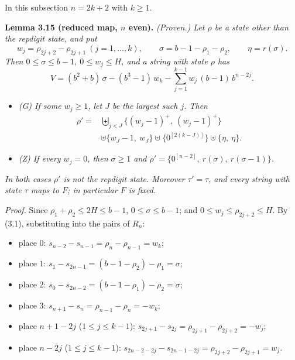 \documentclass[11pt,letterpaper]{article}
\providecommand{\tightlist}{%
  \setlength{\itemsep}{0pt}\setlength{\parskip}{0pt}}
\theoremstyle{paperstyle}
\theoremstyle{paperstyledef}
\theoremstyle{paperstylerem}
\begin{document}
In this subsection \(n = 2k + 2\) with \(k \geq 1\).

\textbf{Lemma 3.15 (reduced map, \(n\) even).} \emph{(Proven.) Let \(\rho\) be a state other than the repdigit state, and put} \[w_j = \rho_{2j+2} - \rho_{2j+1} \ (j = 1, \dots, k), \qquad \sigma = b - 1 - \rho_1 - \rho_2, \qquad \eta = r(\sigma).\] \emph{Then \(0 \leq \sigma \leq b - 1\), \(0 \leq w_j \leq H\), and a string with state \(\rho\) has} \[V = (b^2 + b)\,\sigma - (b^3 - 1)\, w_k - \sum_{j=1}^{k-1} w_j\, (b-1)\, b^{n-2j}.\]

\begin{itemize}
\tightlist
\item
  \emph{(G) If some \(w_j \geq 1\), let \(J\) be the largest such \(j\). Then} \[\begin{aligned} \rho' = {} & \biguplus_{j<J} \{(w_j - 1)^+,\ (w_j - 1)^+\} \\ & \uplus \{w_J - 1,\ w_J\} \uplus \{0^{[2(k-J)]}\} \uplus \{\eta,\ \eta\}. \end{aligned}\]
\item
  \emph{(Z) If every \(w_j = 0\), then \(\sigma \geq 1\) and \(\rho' = \{0^{[n-2]},\ r(\sigma),\ r(\sigma - 1)\}\).}
\end{itemize}

\emph{In both cases \(\rho'\) is not the repdigit state. Moreover \(\tau' = \tau\), and every string with state \(\tau\) maps to \(F\); in particular \(F\) is fixed.}

\emph{Proof.} Since \(\rho_1 + \rho_2 \leq 2H \leq b - 1\), \(0 \leq \sigma \leq b-1\); and \(0 \leq w_j \leq \rho_{2j+2} \leq H\). By (3.1), substituting into the pairs of \(R_n\):

\begin{itemize}
\tightlist
\item
  place \(0\): \(s_{n-2} - s_{n-1} = \rho_n - \rho_{n-1} = w_k\);
\item
  place \(1\): \(s_1 - s_{2n-1} = (b-1-\rho_2) - \rho_1 = \sigma\);
\item
  place \(2\): \(s_0 - s_{2n-2} = (b-1-\rho_1) - \rho_2 = \sigma\);
\item
  place \(3\): \(s_{n+1} - s_n = \rho_{n-1} - \rho_n = -w_k\);
\item
  place \(n+1-2j\) (\(1 \leq j \leq k-1\)): \(s_{2j+1} - s_{2j} = \rho_{2j+1} - \rho_{2j+2} = -w_j\);
\item
  place \(n-2j\) (\(1 \leq j \leq k-1\)): \(s_{2n-2-2j} - s_{2n-1-2j} = \rho_{2j+2} - \rho_{2j+1} = w_j\).
\end{itemize}
\end{document}
